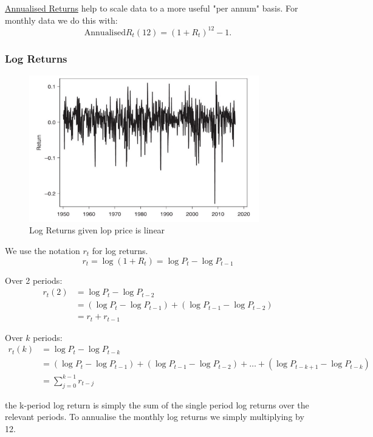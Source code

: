 \documentclass[11pt]{article}
\begin{document}
\underline{Annualised Returns} help to scale data to a more useful "per annum" basis. For monthly data we do this with: 
\[\text{Annualised} R_t(12) = (1+R_t)^{12} - 1.\]

\subsubsection{Log Returns}

\begin{figure}[h]
    \centering
    \includegraphics[width = 10cm]{pics/logreturn.png}
    \caption{Log Returns given lop price is linear}
    \label{fig:log return}
\end{figure}

We use the notation $r_t$ for log returns. 
\[ r_t = \log(1+R_t) = \log P_t - \log P_{t-1}\]

Over 2 periods:
\begin{align*}
    r_t(2) &= \log P_t - \log P_{t-2} \\
    &= (\log P_t - \log P_{t-1}) + (\log P_{t-1} - \log P_{t-2}) \\
    &= r_t + r_{t-1}
\end{align*}

Over $k$ periods:
\begin{align*}
    r_t(k) &= \log P_t - \log P_{t-k} \\
    &= (\log P_t - \log P_{t-1}) + (\log P_{t-1} - \log P_{t-2}) + \ldots +  (\log P_{t-k+1} - \log P_{t-k})\\
    &= \sum_{j=0}^{k-1} r_{t-j}
\end{align*}

\begin{note}
    the k-period log return is simply the sum of the single period log returns over the relevant periods. To annualise the monthly log returns we simply multiplying by 12.
\end{note}
\end{document}
